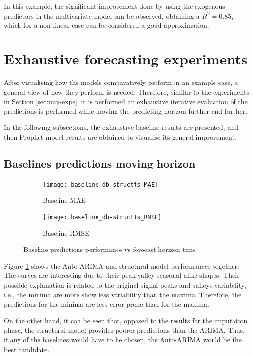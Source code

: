 In this example, the significant improvement done by using the exogenous predictors in the multivariate model can be observed, obtaining a $R^2=0.85$, which for a non-linear case can be considered a good approximation.


\section{Exhaustive forecasting experiments}

After visualising how the models comparatively perform in an example case, a general view of how they perform is needed. Therefore, similar to the experiments in Section \ref{sec:imp-exps}, it is performed an exhaustive iterative evaluation of the predictions is performed while moving the predicting horizon further and further. 

In the following subsections, the exhaustive baseline results are presented, and then Prophet model results are obtained to visualise its general improvement.

\subsection{Baselines predictions moving horizon}

\begin{figure}[htpb]
	\centering
	\begin{subfigure}{.49\textwidth}
		\texttt{[image: baseline\_db-structts\_MAE]}
		\caption{Baseline MAE}
	\end{subfigure}%
	\hfill
	\begin{subfigure}{.49\textwidth}
		\texttt{[image: baseline\_db-structts\_RMSE]}
		\caption{Baseline RMSE}
	\end{subfigure}
	\caption{Baseline predictions performance vs forecast horizon time}
	\label{fig:baseline_performances}
\end{figure}


Figure \ref{fig:baseline_performances} shows the Auto-ARIMA and structural model performances together. The curves are interesting due to their peak-valley seasonal-alike shapes. Their possible explanation is related to the original signal peaks and valleys variability, i.e., the minima are more show less variability than the maxima. Therefore, the predictions for the minima are less error-prone than for the maxima. 

On the other hand, it can be seen that, opposed to the results for the imputation phase, the structural model provides poorer predictions than the ARIMA. Thus, if any of the baselines would have to be chosen, the Auto-ARIMA would be the best candidate.


